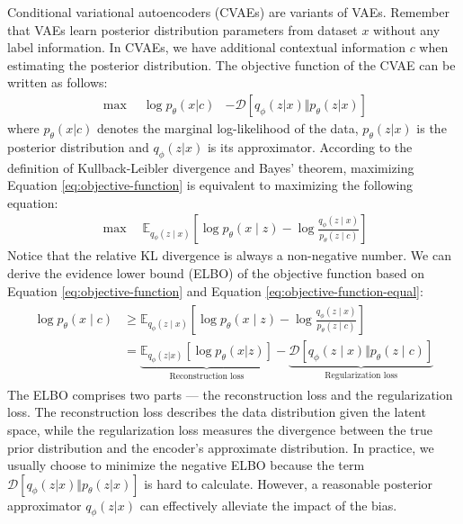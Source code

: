 \documentclass{article}
\begin{document}
Conditional variational autoencoders (CVAEs) are variants of VAEs. Remember that VAEs learn posterior distribution parameters from dataset $x$ without any label information. In CVAEs, we have additional contextual information $c$ when estimating the posterior distribution. The objective function of the CVAE can be written as follows:
\begin{align}
    \max\quad \log p_{\theta}\left(x|c\right) &- \mathcal{D}\left[q_{\phi} \left(z|x\right)\Vert p_{\theta}\left(z|x \right) \right] 
    \label{eq:objective-function}
\end{align}
where $p_\theta(x|c)$ denotes the marginal log-likelihood of the data, $p_\theta(z|x)$ is the posterior distribution and $q_\phi(z|x)$ is its approximator. According to the definition of Kullback-Leibler divergence and Bayes' theorem, maximizing Equation \ref{eq:objective-function} is equivalent to maximizing the following equation:
\begin{align}
    \max\quad \mathbb{E}_{q_{\phi}(z \mid x)}\left[\log p_{\theta}(x \mid z)-\log \frac{q_{\phi}(z \mid x)}{p_{\theta}(z \mid c)}\right]
    \label{eq:objective-function-equal}
\end{align}
Notice that the relative KL divergence is always a non-negative number. We can derive the evidence lower bound (ELBO) of the objective function based on Equation \ref{eq:objective-function} and Equation \ref{eq:objective-function-equal}:
\begin{align}
    \begin{split}
        \log p_{\theta}(x \mid c) &\geq \mathbb{E}_{q_{\phi}(z \mid x)}\left[\log p_{\theta}(x \mid z)-\log \frac{q_{\phi}(z \mid x)}{p_{\theta}(z \mid c)}\right]\\
                                  &= \underbrace{\mathbb{E}_{q_{\phi}(z|x)}\left[\log p_{\theta}\left(x|z \right)\right]}_{\text{Reconstruction loss}} - \underbrace{\mathcal{D}\left[q_{\phi}(z \mid x) \Vert p_{\theta}(z \mid c) \right]}_{\text{Regularization loss}}
    \end{split}
    \label{eq:elbo}
\end{align}
The ELBO comprises two parts --- the reconstruction loss and the regularization loss. The reconstruction loss describes the data distribution given the latent space, while the regularization loss measures the divergence between the true prior distribution and the encoder's approximate distribution. In practice, we usually choose to minimize the negative ELBO because the term $\mathcal{D}\left[q_{\phi} \left(z|x\right)\Vert p_{\theta}\left(z|x \right) \right]$ is hard to calculate. However, a reasonable posterior approximator $q_\phi(z|x)$ can effectively alleviate the impact of the bias.
\end{document}

